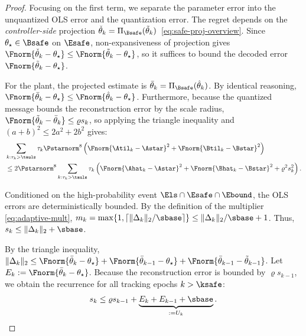 \documentclass[11pt,journal,onecolumn]{IEEEtran}
\begin{document}
\begin{proof}
    Focusing on the first term, we separate the parameter error into the unquantized OLS error and the quantization error. The regret depends on the \emph{controller-side} projection $\check\theta_k = \Pi_{\Bsafe}(\tilde\theta_k)$~\eqref{eq:safe-proj-overview}. Since $\theta_\star \in \Bsafe$ on $\Esafe$, non-expansiveness of projection gives $\Fnorm{\check\theta_k - \theta_\star} \le \Fnorm{\tilde\theta_k - \theta_\star}$, so it suffices to bound the decoded error $\Fnorm{\tilde\theta_k - \theta_\star}$.

    For the plant, the projected estimate is $\bar\theta_k = \Pi_{\Bsafe}(\hat\theta_k)$. By identical reasoning, $\Fnorm{\bar\theta_k - \theta_\star} \le \Fnorm{\hat\theta_k - \theta_\star}$. Furthermore, because the quantized message bounds the reconstruction error by the scale radius, $\Fnorm{\tilde\theta_k - \bar\theta_k} \le \varrho s_k$, so applying the triangle inequality and $(a+b)^2 \le 2a^2 + 2b^2$ gives:
    \begin{align}
        & \sum_{k:\tau_k > \tauls} \tau_k \Pstarnorm^8 \left( \Fnorm{\Atil_k - \Astar}^2 + \Fnorm{\Btil_k - \Bstar}^2 \right) \nonumber \\
        & \le 2\Pstarnorm^8 \sum_{k:\tau_k > \tauls} \tau_k \left( \Fnorm{\Ahat_k - \Astar}^2 + \Fnorm{\Bhat_k - \Bstar}^2 + \varrho^2 s_k^2 \right). \label{eq:quant-error-split}
    \end{align}

    Conditioned on the high-probability event $\Els \cap \Esafe \cap \Ebound$, the OLS errors are deterministically bounded. By the definition of the multiplier \eqref{eq:adaptive-mult}, $m_k = \max\{1, \lceil\|\Delta_k\|_2 / \sbase\rceil\} \le \|\Delta_k\|_2 / \sbase + 1$. Thus, $s_k \le \|\Delta_k\|_2 + \sbase$.

    By the triangle inequality, $\|\Delta_k\|_2 \le \Fnorm{\bar\theta_k - \theta_\star} + \Fnorm{\bar\theta_{k-1} - \theta_\star} + \Fnorm{\bar\theta_{k-1} - \tilde\theta_{k-1}}$. Let $E_k := \Fnorm{\bar\theta_k - \theta_\star}$. Because the reconstruction error is bounded by $\varrho s_{k-1}$, we obtain the recurrence for all tracking epochs $k > \ksafe$:
    \begin{equation}
        s_k \le \varrho s_{k-1} + \underbrace{E_k + E_{k-1} + \sbase}_{:= U_k}.
    \end{equation}


\end{proof}
\end{document}

